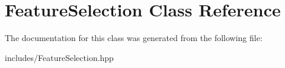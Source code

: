 \hypertarget{class_feature_selection}{}\section{Feature\+Selection Class Reference}
\label{class_feature_selection}


The documentation for this class was generated from the following file\+:\begin{DoxyCompactItemize}
\item 
includes/Feature\+Selection.\+hpp\end{DoxyCompactItemize}
